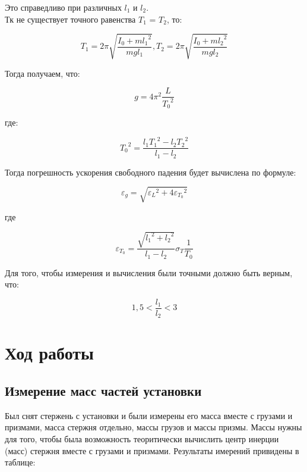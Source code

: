 \documentclass[a4paper]{article}
\begin{document}
Это справедливо при различных $l_1$ и $l_2$.\\

Тк не существует точного равенства $T_1$ = $T_2$, то:

\begin{equation}
	T_1 = 2\pi\sqrt{\frac{I_0 + m{l_1}^2}{mgl_1}},  T_2= 2\pi\sqrt{\frac{I_0 + m{l_2}^2}{mgl_2}}
\end{equation}

Тогда получаем, что:

\begin{equation}
	g = 4\pi^2 \frac{L}{{T_0}^2}
\end{equation}

где:

\begin{equation}
	{T_0}^2 = \frac{l_1 {T_1}^2 - l_2 {T_2}^2}{l_1 - l_2}
\end{equation}

Тогда погрешность ускорения свободного падения будет вычислена по формуле:

\begin{equation}
	\varepsilon_g = \sqrt{{\varepsilon_L}^2 + 4{\varepsilon_{T_0}}^2}
\end{equation}

где

\begin{equation}
	\varepsilon_{T_0} = \frac{\sqrt{{l_1}^2 + {l_2}^2}}{l_1 - l_2} \sigma_T \frac{1}{T_0}
\end{equation}

Для того, чтобы измерения и вычисления были точными должно быть верным, что:

\begin{equation}
	1,5 < \frac{l_1}{l_2} < 3
\end{equation}

\section{Ход работы}

\subsection{Измерение масс частей установки}

Был снят стержень с установки и были измерены его масса вместе с грузами и призмами, масса стержня отдельно, массы грузов и массы призмы. Массы нужны для того, чтобы была возможность теоритически вычислить центр инерции (масс) стержня вместе с грузами и призмами. Результаты имерений привидены в таблице:
\end{document}
